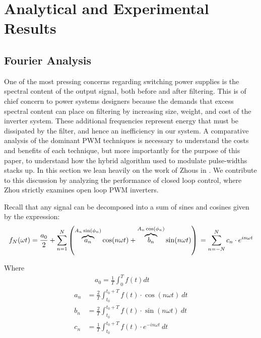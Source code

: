 
\chapter{Analytical and Experimental Results} %

\label{Chapter5} %


\section{Fourier Analysis}
\label{Fourier}
One of the most pressing concerns regarding switching power supplies is the spectral content of the output signal, both before and after filtering. This is of chief concern to power systems designers because the demands that excess spectral content can place on filtering by increasing size, weight, and cost of the inverter system. These additional frequencies represent energy that must be dissipated by the filter, and hence an inefficiency in our system. A comparative analysis of the dominant PWM techniques is necessary to understand the costs and benefits of each technique, but more importantly for the purpose of this paper, to understand how the hybrid algorithm used to modulate pulse-widths stacks up. In this section we lean heavily on the work of Zhous in \cite{FourierAnalysis}. We contribute to this discussion by analyzing the performance of closed loop control, where Zhou strictly examines open loop PWM inverters.

Recall that any signal can be decomposed into a sum of sines and cosines given by the expression:
\begin{equation}
f_N(\omega t) = \frac{a_0}{2} + \sum_{n=1}^N \left(\overbrace{a_n}^{A_n \sin(\phi_n)} \cos(n\omega t) + \overbrace{b_n}^{A_n \cos(\phi_n)} \sin(n\omega t)\right)\\
= \sum_{n=-N}^N c_n\cdot e^{in\omega t}
\end{equation}

Where
\begin{align*}
& ~~~~~ a_0 = \frac{1}{T}\int_{0}^{T}f(t)dt \\
a_n &= \frac{2}{T}\int_{t_0}^{t_0+T} f(t)\cdot  \cos(n\omega t)\ dt \\
b_n &= \frac{2}{T}\int_{t_0}^{t_0+T} f(t)\cdot  \sin(n\omega t)\ dt \\
c_n &= \frac{1}{T}\int_{t_0}^{t_0+T} f(t)\cdot e^{-in\omega t}\ dt
\end{align*}

